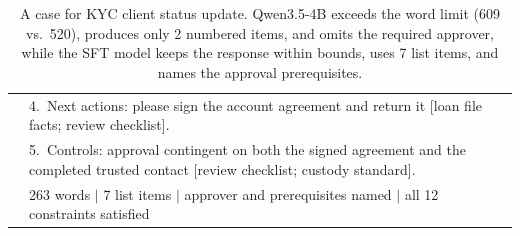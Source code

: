 \begin{table}[t]
\begin{tabular}{p{2.2cm} p{12.8cm}}
& 4.\ Next actions: please sign the account agreement and return it [loan file facts; review checklist]. \\
& 5.\ Controls: approval contingent on both the signed agreement and the completed trusted contact [review checklist; custody standard]. \\
& \colorbox{green!10}{\small\textsf{263 words $\mid$ 7 list items $\mid$ approver and prerequisites named $\mid$ all 12 constraints satisfied}} \\
\bottomrule
\end{tabular}
\caption{A case for KYC client status update. Qwen3.5-4B exceeds the word limit (609 vs.\ 520), produces only 2 numbered items, and omits the required approver, while the SFT model keeps the response within bounds, uses 7 list items, and names the approval prerequisites.}
\label{tab:sft-case-1}
\end{table}


